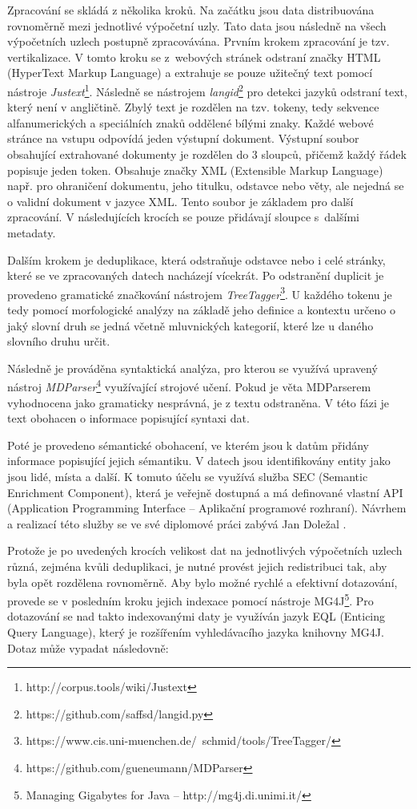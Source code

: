 Zpracování se skládá z několika kroků. Na začátku jsou data distribuována rovnoměrně mezi jednotlivé výpočetní uzly. Tato data jsou následně na všech výpočetních uzlech postupně zpracovávána. Prvním krokem zpracování je tzv. vertikalizace. V tomto kroku se z~webových stránek odstraní značky HTML (HyperText Markup Language) a extrahuje se pouze užitečný text pomocí nástroje  \textit{Justext}\footnote{http://corpus.tools/wiki/Justext}. Následně se nástrojem \textit{langid}\footnote{https://github.com/saffsd/langid.py} pro detekci jazyků odstraní text, který není v angličtině. Zbylý text je rozdělen na tzv. tokeny, tedy sekvence alfanumerických a speciálních znaků oddělené bílými znaky. Každé webové stránce na vstupu odpovídá jeden výstupní dokument. Výstupní soubor obsahující extrahované dokumenty je rozdělen do 3 sloupců, přičemž každý řádek popisuje jeden token. Obsahuje značky XML (Extensible Markup Language) např. pro ohraničení dokumentu, jeho titulku, odstavce nebo věty, ale nejedná se o validní dokument v jazyce XML. Tento soubor je základem pro další zpracování. V následujících krocích se pouze přidávají sloupce s~dalšími metadaty.

Dalším krokem je deduplikace, která odstraňuje odstavce nebo i celé stránky, které se ve zpracovaných datech nacházejí vícekrát. Po odstranění duplicit je provedeno gramatické značkování nástrojem \textit{TreeTagger}\footnote{https://www.cis.uni-muenchen.de/~schmid/tools/TreeTagger/}. U každého tokenu je tedy pomocí morfologické analýzy na základě jeho definice a kontextu určeno o jaký slovní druh se jedná včetně mluvnických kategorií, které lze u daného slovního druhu určit.

Následně je prováděna syntaktická analýza, pro kterou se využívá upravený nástroj  \textit{MDParser}\footnote{https://github.com/gueneumann/MDParser} využívající strojové učení. Pokud je věta MDParserem vyhodnocena jako gramaticky nesprávná, je z textu odstraněna. V této fázi je text obohacen o informace popisující syntaxi dat. 

Poté je provedeno sémantické obohacení, ve kterém jsou k datům přidány informace popisující jejich sémantiku. V datech jsou identifikovány entity jako jsou lidé, místa a další. K tomuto účelu se využívá služba SEC (Semantic Enrichment Component), která je veřejně dostupná a má definované vlastní API (Application Programming Interface -- Aplikační programové rozhraní).  Návrhem a realizací této služby se ve své diplomové práci zabývá Jan Doležal \cite{SEC}.

Protože je po uvedených krocích velikost dat na jednotlivých výpočetních uzlech různá, zejména kvůli deduplikaci, je nutné provést jejich redistribuci tak, aby byla opět rozdělena rovnoměrně. Aby bylo možné rychlé a efektivní dotazování, provede se v posledním kroku jejich indexace pomocí nástroje MG4J\footnote{Managing Gigabytes for Java -- http://mg4j.di.unimi.it/}. Pro dotazování se nad takto indexovanými daty je využíván jazyk EQL (Enticing Query Language), který je rozšířením vyhledávacího jazyka knihovny MG4J. Dotaz může vypadat následovně:

